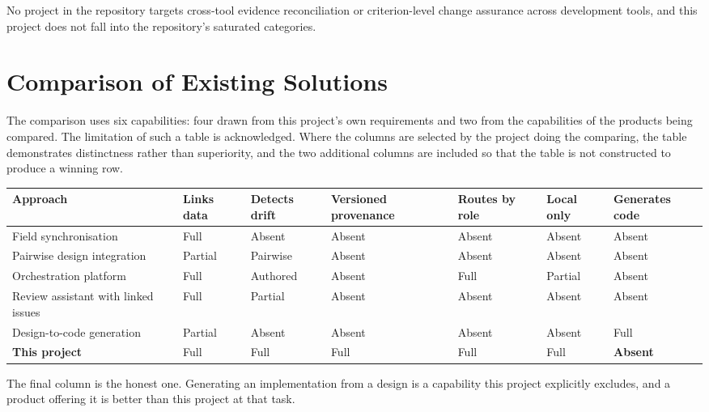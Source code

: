 No project in the repository targets cross-tool evidence reconciliation or
criterion-level change assurance across development tools, and this project does
not fall into the repository's saturated categories.

\section{Comparison of Existing Solutions}

The comparison uses six capabilities: four drawn from this project's own
requirements and two from the capabilities of the products being compared. The
limitation of such a table is acknowledged. Where the columns are selected by
the project doing the comparing, the table demonstrates distinctness rather than
superiority, and the two additional columns are included so that the table is
not constructed to produce a winning row.

\begin{longtable}{>{\raggedright\arraybackslash}p{}>{\raggedright\arraybackslash}p{}>{\raggedright\arraybackslash}p{}>{\raggedright\arraybackslash}p{}>{\raggedright\arraybackslash}p{}>{\raggedright\arraybackslash}p{}>{\raggedright\arraybackslash}p{}}
\toprule
Approach & Links data & Detects drift & Versioned provenance & Routes by role & Local only & Generates code \\
\midrule
\endhead
Field synchronisation & Full & Absent & Absent & Absent & Absent & Absent \\
Pairwise design integration & Partial & Pairwise & Absent & Absent & Absent & Absent \\
Orchestration platform & Full & Authored & Absent & Full & Partial & Absent \\
Review assistant with linked issues & Full & Partial & Absent & Absent & Absent & Absent \\
Design-to-code generation & Partial & Absent & Absent & Absent & Absent & Full \\
\textbf{This project} & Full & Full & Full & Full & Full & \textbf{Absent} \\
\bottomrule
\end{longtable}

The final column is the honest one. Generating an implementation from a design
is a capability this project explicitly excludes, and a product offering it is
better than this project at that task.

